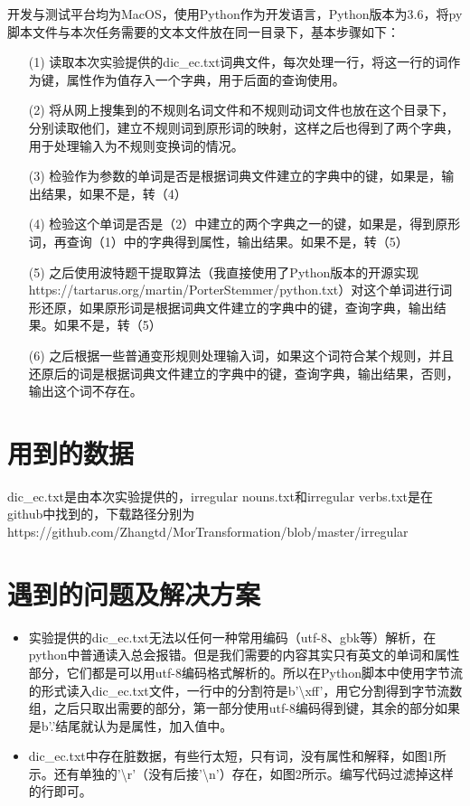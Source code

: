 \documentclass[UTF8]{article}
\begin{document}
开发与测试平台均为MacOS，使用Python作为开发语言，Python版本为3.6，将py脚本文件与本次任务需要的文本文件放在同一目录下，基本步骤如下：
\begin{itemize}
    \item[(1)] 读取本次实验提供的dic\_ec.txt词典文件，每次处理一行，将这一行的词作为键，属性作为值存入一个字典，用于后面的查询使用。
    
    \item[(2)]  将从网上搜集到的不规则名词文件和不规则动词文件也放在这个目录下，分别读取他们，建立不规则词到原形词的映射，这样之后也得到了两个字典，用于处理输入为不规则变换词的情况。
    
    \item[(3)]  检验作为参数的单词是否是根据词典文件建立的字典中的键，如果是，输出结果，如果不是，转（4）
    
    \item[(4)]  检验这个单词是否是（2）中建立的两个字典之一的键，如果是，得到原形词，再查询（1）中的字典得到属性，输出结果。如果不是，转（5）
    \item[(5)] 之后使用波特题干提取算法（我直接使用了Python版本的开源实现https://tartarus.org/martin/PorterStemmer/python.txt）对这个单词进行词形还原，如果原形词是根据词典文件建立的字典中的键，查询字典，输出结果。如果不是，转（5）
    \item[(6)] 之后根据一些普通变形规则处理输入词，如果这个词符合某个规则，并且还原后的词是根据词典文件建立的字典中的键，查询字典，输出结果，否则，输出这个词不存在。

\end{itemize}
\section{用到的数据}
dic\_ec.txt是由本次实验提供的，irregular nouns.txt和irregular verbs.txt是在github中找到的，下载路径分别为https://github.com/Zhangtd/MorTransformation/blob/master/irregular%
\section{遇到的问题及解决方案}
\begin{itemize}

	\item 实验提供的dic\_ec.txt无法以任何一种常用编码（utf-8、gbk等）解析，在python中普通读入总会报错。但是我们需要的内容其实只有英文的单词和属性部分，它们都是可以用utf-8编码格式解析的。所以在Python脚本中使用字节流的形式读入dic\_ec.txt文件，一行中的分割符是b'\textbackslash xff'，用它分割得到字节流数组，之后只取出需要的部分，第一部分使用utf-8编码得到键，其余的部分如果是b'.'结尾就认为是属性，加入值中。
	\item dic\_ec.txt中存在脏数据，有些行太短，只有词，没有属性和解释，如图1所示。还有单独的'\textbackslash r'（没有后接'\textbackslash n'）存在，如图2所示。编写代码过滤掉这样的行即可。

\end{itemize}
\begin{center}

\end{center}
\end{document}
